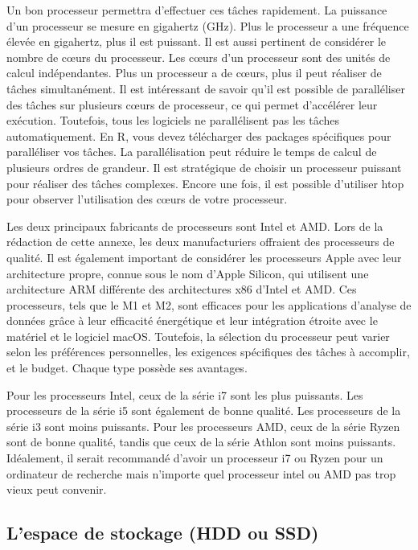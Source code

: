 \documentclass[
  letterpaper,
  DIV=11,
  numbers=noendperiod]{scrreprt}
\begin{document}
Un bon processeur permettra d'effectuer ces tâches rapidement. La
puissance d'un processeur se mesure en gigahertz (GHz). Plus le
processeur a une fréquence élevée en gigahertz, plus il est puissant. Il
est aussi pertinent de considérer le nombre de cœurs du processeur. Les
cœurs d'un processeur sont des unités de calcul indépendantes. Plus un
processeur a de cœurs, plus il peut réaliser de tâches simultanément. Il
est intéressant de savoir qu'il est possible de paralléliser des tâches
sur plusieurs cœurs de processeur, ce qui permet d'accélérer leur
exécution. Toutefois, tous les logiciels ne parallélisent pas les tâches
automatiquement. En R, vous devez télécharger des packages spécifiques
pour paralléliser vos tâches. La parallélisation peut réduire le temps
de calcul de plusieurs ordres de grandeur. Il est stratégique de choisir
un processeur puissant pour réaliser des tâches complexes. Encore une
fois, il est possible d'utiliser htop pour observer l'utilisation des
cœurs de votre processeur.

Les deux principaux fabricants de processeurs sont Intel et AMD. Lors de
la rédaction de cette annexe, les deux manufacturiers offraient des
processeurs de qualité. Il est également important de considérer les
processeurs Apple avec leur architecture propre, connue sous le nom
d'Apple Silicon, qui utilisent une architecture ARM différente des
architectures x86 d'Intel et AMD. Ces processeurs, tels que le M1 et M2,
sont efficaces pour les applications d'analyse de données grâce à leur
efficacité énergétique et leur intégration étroite avec le matériel et
le logiciel macOS. Toutefois, la sélection du processeur peut varier
selon les préférences personnelles, les exigences spécifiques des tâches
à accomplir, et le budget. Chaque type possède ses avantages.

Pour les processeurs Intel, ceux de la série i7 sont les plus puissants.
Les processeurs de la série i5 sont également de bonne qualité. Les
processeurs de la série i3 sont moins puissants. Pour les processeurs
AMD, ceux de la série Ryzen sont de bonne qualité, tandis que ceux de la
série Athlon sont moins puissants. Idéalement, il serait recommandé
d'avoir un processeur i7 ou Ryzen pour un ordinateur de recherche mais
n'importe quel processeur intel ou AMD pas trop vieux peut convenir.

\subsection{L'espace de stockage (HDD ou
SSD)}\label{lespace-de-stockage-hdd-ou-ssd}
\end{document}
